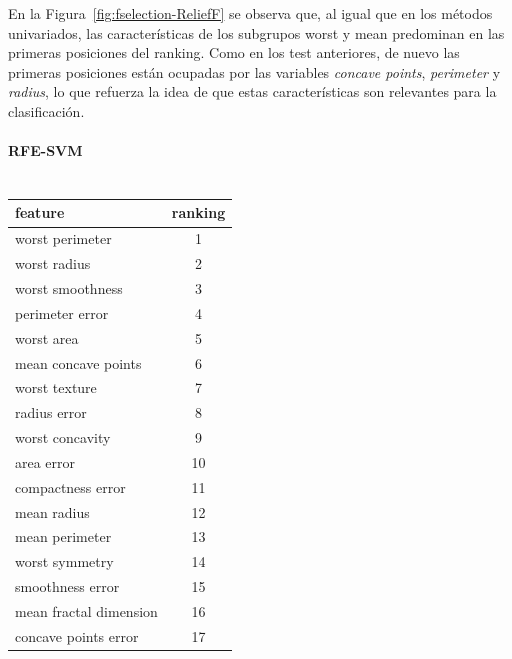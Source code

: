 \documentclass[a4paper,12pt]{article}
\begin{document}
En la Figura~\ref{fig:fselection-ReliefF} se observa que, al igual que en los métodos univariados, las características de los subgrupos worst y mean predominan en las primeras posiciones del ranking. Como en los test anteriores, de nuevo las primeras posiciones están ocupadas por las variables \textit{concave points}, \textit{perimeter} y \textit{radius}, lo que refuerza la idea de que estas características son relevantes para la clasificación.

\paragraph{RFE-SVM \\ \\}

\begin{table}
    \tiny
    \centering
    \begin{tabular}{|l c|}
        \hline
        \textbf{feature}        & \textbf{ranking} \\
        \hline
        worst perimeter         & 1                \\
        worst radius            & 2                \\
        worst smoothness        & 3                \\
        perimeter error         & 4                \\
        worst area              & 5                \\
        mean concave points     & 6                \\
        worst texture           & 7                \\
        radius error            & 8                \\
        worst concavity         & 9                \\
        area error              & 10               \\
        compactness error       & 11               \\
        mean radius             & 12               \\
        mean perimeter          & 13               \\
        worst symmetry          & 14               \\
        smoothness error        & 15               \\
        mean fractal dimension  & 16               \\
        concave points error    & 17               \\

\end{tabular}
\end{table}
\end{document}
